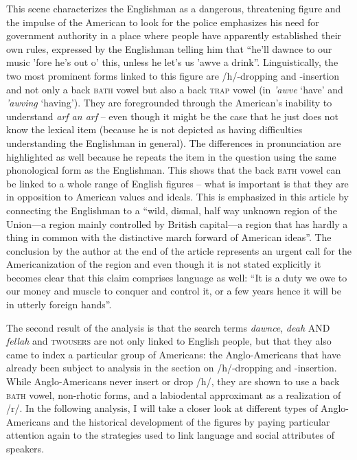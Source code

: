 This scene characterizes the Englishman as a dangerous, threatening figure and the impulse of the American to look for the police emphasizes his need for government authority in a place where people have apparently established their own rules, expressed by the Englishman telling him that “he’ll dawnce to our music ’fore he’s out o’ this, unless he let’s us ’awve a drink”. Linguistically, the two most prominent forms linked to this figure are /h/-dropping and -insertion and not only a back \textsc{bath} vowel but also a back \textsc{trap} vowel (in \emph{’awve} ‘have’ and \emph{’awving} ‘having’). They are foregrounded through the American’s inability to understand \emph{arf an arf} – even though it might be the case that he just does not know the lexical item (because he is not depicted as having difficulties understanding the Englishman in general). The differences in pronunciation are highlighted as well because he repeats the item in the question using the same phonological form as the Englishman. This shows that the back \textsc{bath} vowel can be linked to a whole range of English figures – what is important is that they are in opposition to American values and ideals. This is emphasized in this article by connecting the Englishman to a “wild, dismal, half way unknown region of the Union—a region mainly controlled by British capital—a region that has hardly a thing in common with the distinctive march forward of American ideas”. The conclusion by the author at the end of the article represents an urgent call for the Americanization of the region and even though it is not stated explicitly it becomes clear that this claim comprises language as well: “It is a duty we owe to our money and muscle to conquer and control it, or a few years hence it will be in utterly foreign hands”.


The second result of the analysis is that the search terms \emph{dawnce}, \emph{deah} AND \emph{fellah} and \textsc{twousers} are not only linked to English people, but that they also came to index a particular group of Americans: the Anglo-Americans that have already been subject to analysis in the section on /h/-dropping and -insertion. While Anglo-Americans never insert or drop /h/, they are shown to use a back \textsc{bath} vowel, non-rhotic forms, and a labiodental approximant as a realization of /r/. In the following analysis, I will take a closer look at different types of Anglo-Americans and the historical development of the figures by paying particular attention again to the strategies used to link language and social attributes of speakers.

